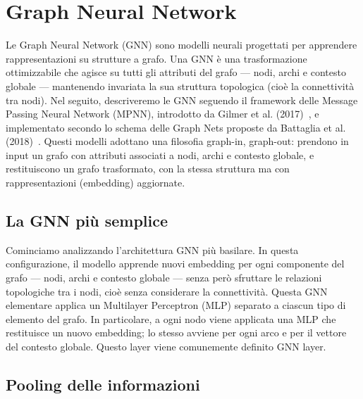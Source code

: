 \section{Graph Neural Network}

Le Graph Neural Network (GNN) sono modelli neurali progettati per apprendere rappresentazioni su strutture a grafo. Una GNN è una trasformazione ottimizzabile che agisce su tutti gli attributi del grafo — nodi, archi e contesto globale — mantenendo invariata la sua struttura topologica (cioè la connettività tra nodi). Nel seguito, descriveremo le GNN seguendo il framework delle Message Passing Neural Network (MPNN), introdotto da Gilmer et al. (2017)~\cite{gilmer2017neural}, e implementato secondo lo schema delle Graph Nets proposte da Battaglia et al. (2018)~\cite{battaglia2018relational}. Questi modelli adottano una filosofia graph-in, graph-out: prendono in input un grafo con attributi associati a nodi, archi e contesto globale, e restituiscono un grafo trasformato, con la stessa struttura ma con rappresentazioni (embedding) aggiornate.

\subsection{La GNN più semplice}

Cominciamo analizzando l’architettura GNN più basilare. In questa configurazione, il modello apprende nuovi embedding per ogni componente del grafo — nodi, archi e contesto globale — senza però sfruttare le relazioni topologiche tra i nodi, cioè senza considerare la connettività. Questa GNN elementare applica un Multilayer Perceptron (MLP) separato a ciascun tipo di elemento del grafo. In particolare, a ogni nodo viene applicata una MLP che restituisce un nuovo embedding; lo stesso avviene per ogni arco e per il vettore del contesto globale. Questo layer viene comunemente definito GNN layer.

\subsection{Pooling delle informazioni}

